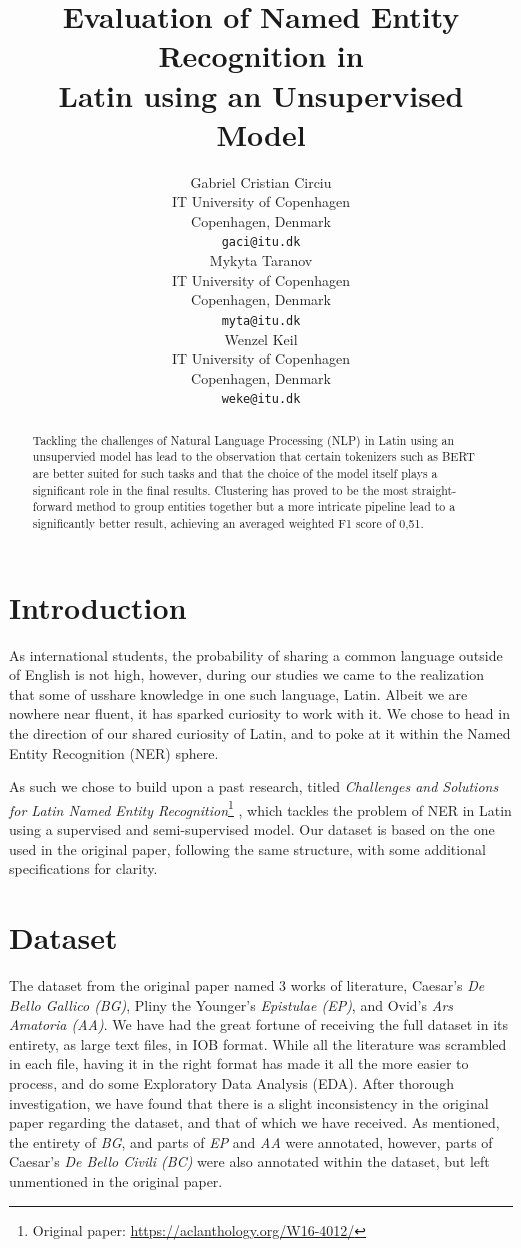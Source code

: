 \documentclass[11pt]{article}
\title{Evaluation of Named Entity Recognition in \\ Latin using an Unsupervised Model}
\author{
  Gabriel Cristian Circiu \\
  IT University of Copenhagen \\ Copenhagen, Denmark \\
  \texttt{gaci@itu.dk} \\\And
  Mykyta Taranov \\
  IT University of Copenhagen \\ Copenhagen, Denmark \\
  \texttt{myta@itu.dk} \\\And
  Wenzel Keil \\
  IT University of Copenhagen \\ Copenhagen, Denmark \\
  \texttt{weke@itu.dk}
}
\begin{document}
\maketitle
\begin{abstract}
Tackling the challenges of Natural Language Processing (NLP) in Latin using an unsupervied model has lead to the observation that certain tokenizers 
such as BERT are better suited for such tasks and that the choice of the model itself plays a significant role in the final results.
Clustering has proved to be the most straight-forward method to group entities together but a more intricate pipeline lead to a significantly 
better result, achieving an averaged weighted F1 score of 0,51.
\end{abstract}

\section{Introduction}

As international students, the probability of sharing a common language outside of English is not high, however, during our studies we came to the 
realization that some of usshare knowledge in one such language, Latin. Albeit we are nowhere near fluent, it has sparked curiosity to work with it.
We chose to head in the direction of our shared curiosity of Latin, and to poke at it within the Named Entity Recognition (NER) sphere.

As such we chose to build upon a past research, titled 
\textit{Challenges and Solutions for Latin Named Entity Recognition}\footnote{Original paper: \url{https://aclanthology.org/W16-4012/}}
\cite{erdmann-etal-2016-challenges}, which tackles the problem of NER in Latin using a supervised and semi-supervised model.
Our dataset is based on the one used in the original paper, following the same structure, with some additional specifications for clarity.

\section{Dataset}

The dataset from the original paper named 3 works of literature, Caesar's \textit{De Bello Gallico (BG)}, Pliny the Younger's \textit{Epistulae (EP)},
and Ovid's \textit{Ars Amatoria (AA)}. We have had the great fortune of receiving the full dataset in its entirety, as large text files, in IOB format.
While all the literature was scrambled in each file, having it in the right format has made it all the more easier to process, and do some
Exploratory Data Analysis (EDA). After thorough investigation, we have found that there is a slight inconsistency in the original paper regarding 
the dataset, and that of which we have received. As mentioned, the entirety of \textit{BG}, and parts of \textit{EP} and \textit{AA} were annotated,
however, parts of Caesar's \textit{De Bello Civili (BC)} were also annotated within the dataset, but left unmentioned in the original paper.
\end{document}
